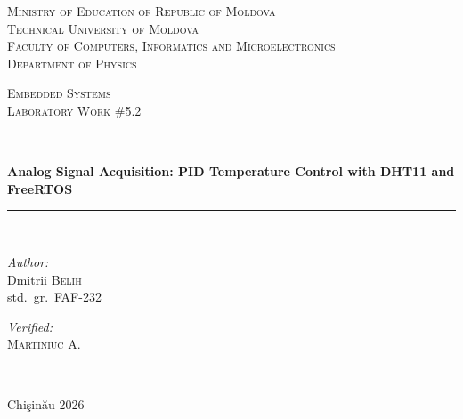 \documentclass[12pt]{article}
\begin{document}

\begin{titlepage}
    \thispagestyle{empty}
    \begin{center}
        \textsc{\large Ministry of Education of Republic of Moldova}\\[0.5cm]
        \textsc{\large Technical University of Moldova}\\[0.5cm]
        \textsc{\large Faculty of Computers, Informatics and Microelectronics}\\[0.5cm]
        \textsc{\large Department of Physics}\\[1.2cm]
    \end{center}

    \vspace{20mm}

    \begin{center}
        \textsc{\Large Embedded Systems}\\[0.5cm]
        \textsc{\large Laboratory Work \#5.2}\\[0.5cm]
        \newcommand{\HRule}{\rule{\linewidth}{0.5mm}}
        \vspace{8mm}
        \HRule\\[0.4cm]
        {\LARGE \bfseries Analog Signal Acquisition: PID Temperature Control with DHT11 and FreeRTOS}\\[0.4cm]
        \HRule\\[1.5cm]
    \end{center}

    \vspace{8mm}

    \begin{minipage}[t]{0.4\textwidth}
        \begin{flushleft}\large
            \emph{Author:}\\
            Dmitrii \textsc{Belih}\\
            std.\ gr.\ FAF-232
        \end{flushleft}
    \end{minipage}
    \hfill
    \begin{minipage}[t]{0.4\textwidth}
        \begin{flushright}\large
            \emph{Verified:}\\
            \textsc{Martiniuc} A.\\
        \end{flushright}
    \end{minipage}\\[3cm]

    \vspace{5mm}
    \begin{center}
        \large Chi\c{s}in\u{a}u 2026
    \end{center}
    \vfill
\end{titlepage}
\end{document}
